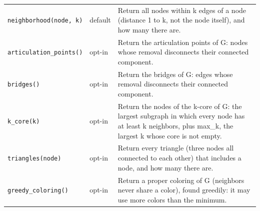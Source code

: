 {\begin{longtable}{>{\raggedright\arraybackslash}p{4.4cm} l >{\raggedright\arraybackslash}p{8.2cm}}
    \texttt{neighborhood(node, k)} & default & Return all nodes within k edges of a node (distance 1 to k, not the node itself), and how many there are. \\
    \texttt{articulation\_points()} & opt-in & Return the articulation points of G: nodes whose removal disconnects their connected component. \\
    \texttt{bridges()} & opt-in & Return the bridges of G: edges whose removal disconnects their connected component. \\
    \texttt{k\_core(k)} & opt-in & Return the nodes of the k-core of G: the largest subgraph in which every node has at least k neighbors, plus max\_k, the largest k whose core is not empty. \\
    \texttt{triangles(node)} & opt-in & Return every triangle (three nodes all connected to each other) that includes a node, and how many there are. \\
    \texttt{greedy\_coloring()} & opt-in & Return a proper coloring of G (neighbors never share a color), found greedily: it may use more colors than the minimum. \\
\end{longtable}
}

